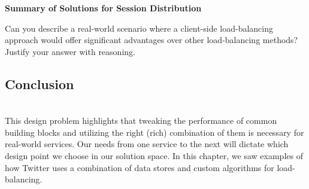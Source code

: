 \textbf{Summary of Solutions for Session Distribution}

\begin{table}[htbp]
\centering
\small
{}
\caption{Summary of Solutions for Session Distribution}
\end{table}

Can you describe a real-world scenario where a client-side load-balancing approach would offer significant advantages over other load-balancing methods? Justify your answer with reasoning.

\subsection{Conclusion}\label{s3KVLv7uyu4OWptmF3DNu}
\\
This design problem highlights that tweaking the performance of common building blocks and utilizing the right (rich) combination of them is necessary for real-world services. Our needs from one service to the next will dictate which design point we choose in our solution space. In this chapter, we saw examples of how Twitter uses a combination of data stores and custom algorithms for load-balancing.


